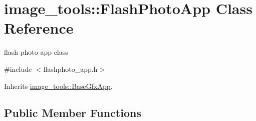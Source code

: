 \hypertarget{classimage__tools_1_1FlashPhotoApp}{}\section{image\+\_\+tools\+:\+:Flash\+Photo\+App Class Reference}
\label{classimage__tools_1_1FlashPhotoApp}


flash photo app class  




{\ttfamily \#include $<$flashphoto\+\_\+app.\+h$>$}



Inherits \hyperlink{classimage__tools_1_1BaseGfxApp}{image\+\_\+tools\+::\+Base\+Gfx\+App}.

\subsection*{Public Member Functions}
